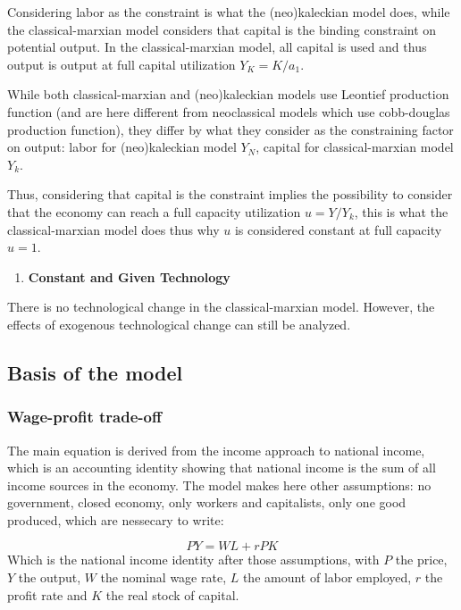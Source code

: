 \documentclass[
  letterpaper,
  DIV=11,
  numbers=noendperiod]{scrreprt}
\providecommand{\tightlist}{%
  \setlength{\itemsep}{0pt}\setlength{\parskip}{0pt}}\usepackage{longtable,booktabs,array}
\begin{document}
Considering labor as the constraint is what the (neo)kaleckian model
does, while the classical-marxian model considers that capital is the
binding constraint on potential output. In the classical-marxian model,
all capital is used and thus output is output at full capital
utilization \(Y_K = K/a_1\).

While both classical-marxian and (neo)kaleckian models use Leontief
production function (and are here different from neoclassical models
which use cobb-douglas production function), they differ by what they
consider as the constraining factor on output: labor for (neo)kaleckian
model \(Y_N\), capital for classical-marxian model \(Y_k\).

Thus, considering that capital is the constraint implies the possibility
to consider that the economy can reach a full capacity utilization
\(u = Y/Y_k\), this is what the classical-marxian model does thus why
\(u\) is considered constant at full capacity \(u = 1\).

\begin{enumerate}
\def\labelenumi{\arabic{enumi}.}
\setcounter{enumi}{1}
\tightlist
\item
  \textbf{Constant and Given Technology}
\end{enumerate}

There is no technological change in the classical-marxian model.
However, the effects of exogenous technological change can still be
analyzed.

\hypertarget{basis-of-the-model}{%
\subsection{Basis of the model}\label{basis-of-the-model}}

\hypertarget{wage-profit-trade-off}{%
\subsubsection{Wage-profit trade-off}\label{wage-profit-trade-off}}

The main equation is derived from the income approach to national
income, which is an accounting identity showing that national income is
the sum of all income sources in the economy. The model makes here other
assumptions: no government, closed economy, only workers and
capitalists, only one good produced, which are nessecary to write:

\[
PY = WL + rPK
\] Which is the national income identity after those assumptions, with
\(P\) the price, \(Y\) the output, \(W\) the nominal wage rate, \(L\)
the amount of labor employed, \(r\) the profit rate and \(K\) the real
stock of capital.
\end{document}
